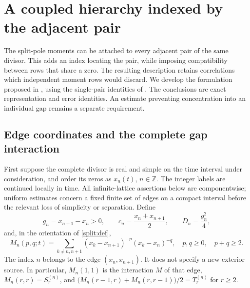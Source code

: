 \section{A coupled hierarchy indexed by the adjacent pair}
\label{sec:lattice}

The split-pole moments can be attached to every adjacent pair of the
same divisor. This adds an index locating the pair, while imposing
compatibility between rows that share a zero. The resulting description
retains correlations which independent moment rows would discard.
We develop the formulation proposed in \cite{BakerCM29}, using the
single-pair identities of \cite{BakerCM08,BakerCM09}. The conclusions
are exact representation and error identities. An estimate preventing
concentration into an individual gap remains a separate requirement.

\subsection{Edge coordinates and the complete gap interaction}

First suppose the complete divisor is real and simple on the time
interval under consideration, and order its zeros as $x_n(t)$,
$n\in\mathbb Z$. The integer labels are continued locally in time.
All infinite-lattice assertions below are componentwise; uniform
estimates concern a fixed finite set of edges on a compact interval
before the relevant loss of simplicity or separation. Define
\begin{equation}
 g_n=x_{n+1}-x_n>0,\qquad
 c_n=\frac{x_n+x_{n+1}}2,\qquad D_n=\frac{g_n^2}{4},
 \label{lat:coordinates}
\end{equation}
and, in the orientation of \eqref{split:def},
\begin{equation}
 M_n(p,q;t)=\sum_{k\ne n,n+1}
       (x_k-x_{n+1})^{-p}(x_k-x_n)^{-q},
 \quad p,q\ge0,\quad p+q\ge2.
 \label{lat:moments}
\end{equation}
The index $n$ belongs to the edge $(x_n,x_{n+1})$. It does not
specify a new exterior source. In particular,
$M_n(1,1)$ is the interaction $M$ of that edge,
$M_n(r,r)=S_r^{(n)}$, and
$\bigl(M_n(r-1,r)+M_n(r,r-1)\bigr)/2=T_r^{(n)}$ for $r\ge2$.

